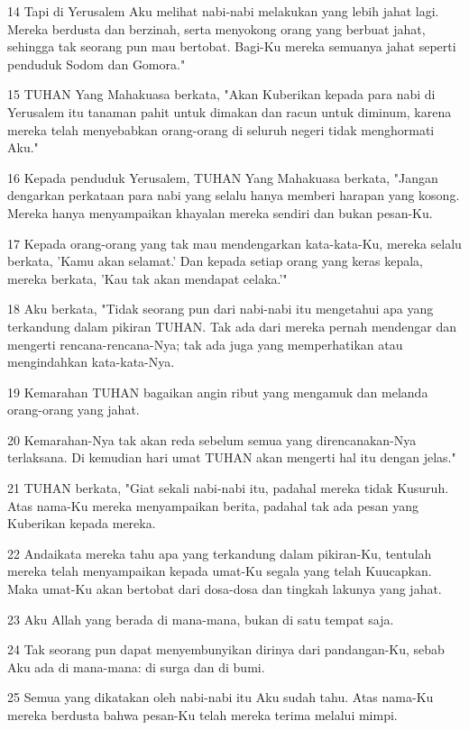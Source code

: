 \par 14 Tapi di Yerusalem Aku melihat nabi-nabi melakukan yang lebih jahat lagi. Mereka berdusta dan berzinah, serta menyokong orang yang berbuat jahat, sehingga tak seorang pun mau bertobat. Bagi-Ku mereka semuanya jahat seperti penduduk Sodom dan Gomora."
\par 15 TUHAN Yang Mahakuasa berkata, "Akan Kuberikan kepada para nabi di Yerusalem itu tanaman pahit untuk dimakan dan racun untuk diminum, karena mereka telah menyebabkan orang-orang di seluruh negeri tidak menghormati Aku."
\par 16 Kepada penduduk Yerusalem, TUHAN Yang Mahakuasa berkata, "Jangan dengarkan perkataan para nabi yang selalu hanya memberi harapan yang kosong. Mereka hanya menyampaikan khayalan mereka sendiri dan bukan pesan-Ku.
\par 17 Kepada orang-orang yang tak mau mendengarkan kata-kata-Ku, mereka selalu berkata, 'Kamu akan selamat.' Dan kepada setiap orang yang keras kepala, mereka berkata, 'Kau tak akan mendapat celaka.'"
\par 18 Aku berkata, "Tidak seorang pun dari nabi-nabi itu mengetahui apa yang terkandung dalam pikiran TUHAN. Tak ada dari mereka pernah mendengar dan mengerti rencana-rencana-Nya; tak ada juga yang memperhatikan atau mengindahkan kata-kata-Nya.
\par 19 Kemarahan TUHAN bagaikan angin ribut yang mengamuk dan melanda orang-orang yang jahat.
\par 20 Kemarahan-Nya tak akan reda sebelum semua yang direncanakan-Nya terlaksana. Di kemudian hari umat TUHAN akan mengerti hal itu dengan jelas."
\par 21 TUHAN berkata, "Giat sekali nabi-nabi itu, padahal mereka tidak Kusuruh. Atas nama-Ku mereka menyampaikan berita, padahal tak ada pesan yang Kuberikan kepada mereka.
\par 22 Andaikata mereka tahu apa yang terkandung dalam pikiran-Ku, tentulah mereka telah menyampaikan kepada umat-Ku segala yang telah Kuucapkan. Maka umat-Ku akan bertobat dari dosa-dosa dan tingkah lakunya yang jahat.
\par 23 Aku Allah yang berada di mana-mana, bukan di satu tempat saja.
\par 24 Tak seorang pun dapat menyembunyikan dirinya dari pandangan-Ku, sebab Aku ada di mana-mana: di surga dan di bumi.
\par 25 Semua yang dikatakan oleh nabi-nabi itu Aku sudah tahu. Atas nama-Ku mereka berdusta bahwa pesan-Ku telah mereka terima melalui mimpi.
